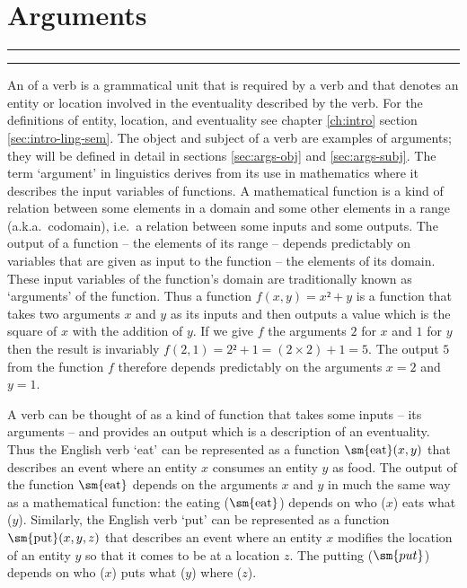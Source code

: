 
\resetexcnt
\chapter{Arguments}\label{ch:args}

\startcontents[chapters]
\noindent\rule[0.5em]{\textwidth}{\heavyrulewidth}
\noindent\rule{\textwidth}{\heavyrulewidth}
\vspace{1\baselineskip}


An  of a verb is a grammatical unit that is required by a verb and that denotes an entity or location involved in the eventuality described by the verb.
For the definitions of entity, location, and eventuality see chapter \ref{ch:intro} section \ref{sec:intro-ling-sem}.
The object and subject of a verb are examples of arguments; they will be defined in detail in sections \ref{sec:args-obj} and \ref{sec:args-subj}.
The term ‘argument’ in linguistics derives from its use in mathematics where it describes the input variables of functions.
A mathematical function is a kind of relation between some elements in a domain and some other elements in a range (a.k.a.\ codomain), i.e.\ a relation between some inputs and some outputs.
The output of a function – the elements of its range – depends predictably on variables that are given as input to the function – the elements of its domain.
These input variables of the function’s domain are traditionally known as ‘arguments’ of the function.
Thus a function $f(x, y) = x² + y$ is a function that takes two arguments $x$ and $y$ as its inputs and then outputs a value which is the square of $x$ with the addition of $y$.
If we give $f$ the arguments $2$ for $x$ and $1$ for $y$ then the result is invariably $f(2, 1) = 2² + 1 = (2 × 2) + 1 = 5$.
The output $5$ from the function $f$ therefore depends predictably on the arguments $x = 2$ and $y = 1$.

A verb can be thought of as a kind of function that takes some inputs – its arguments – and provides an output which is a description of an eventuality.
Thus the English verb ‘eat’ can be represented as a function $\text{\sm{eat}}(x, y)$ that describes an event where an entity $x$ consumes an entity $y$ as food.
The output of the function $\text{\sm{eat}}$ depends on the arguments $x$ and $y$ in much the same way as a mathematical function: the eating ($\text{\sm{eat}}$) depends on who ($x$) eats what ($y$).
Similarly, the English verb ‘put’ can be represented as a function $\text{\sm{put}}(x, y, z)$ that describes an event where an entity $x$ modifies the location of an entity $y$ so that it comes to be at a location $z$.
The putting ($\sm{put}$) depends on who ($x$) puts what ($y$) where ($z$).

